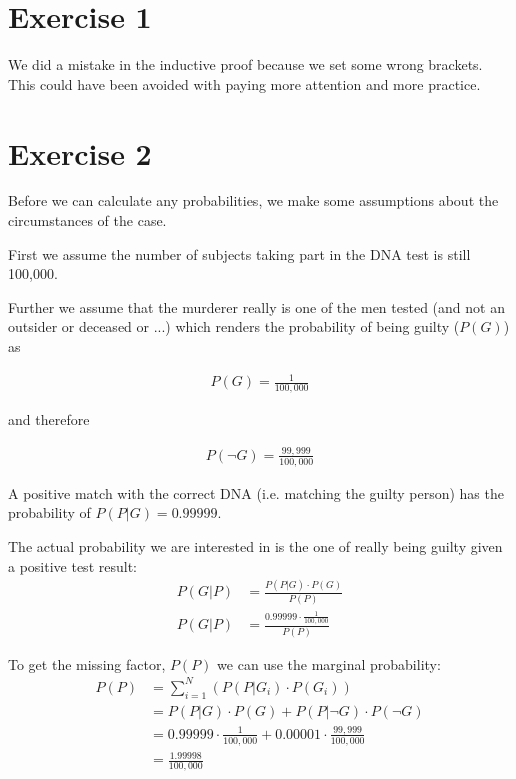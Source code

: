 \def \TutorialSheetNumber{3}

\section*{Exercise 1}
We did a mistake in the inductive proof because we set some wrong brackets. This could have been avoided with paying more attention and more practice.

\section*{Exercise 2}
Before we can calculate any probabilities, we make some assumptions about the circumstances of the case. 

First we assume the number of subjects taking part in the DNA test is still 100,000. 

Further we assume that the murderer really is one of the men tested (and not an outsider or deceased or ...) which renders the probability of being guilty ($P(G)$) as

\begin{align*}
P(G) = \frac{1}{100,000}
\end{align*}

and therefore

\begin{align*}
P(\neg G) = \frac{99,999}{100,000}
\end{align*}

A positive match with the correct DNA (i.e. matching the guilty person) has the probability of $P(P|G) = 0.99999$.

The actual probability we are interested in is the one of really being guilty given a positive test result:
\begin{align*}
P(G|P) &= \frac{P(P|G) \cdot P(G)}{P(P)} \\
P(G|P) &= \frac{0.99999 \cdot \frac{1}{100,000}}{P(P)}
\end{align*}

To get the missing factor, $P(P)$ we can use the marginal probability:
\begin{align*}
P(P) &= \sum\limits_{i=1}^{N} \left( P(P|G_i) \cdot P(G_i) \right) \\
     &= P(P|G) \cdot P(G) + P(P|\neg G) \cdot P(\neg G) \\
     &= 0.99999 \cdot \frac{1}{100,000} + 0.00001 \cdot \frac{99,999}{100,000} \\
     &= \frac{1.99998}{100,000}
\end{align*}

